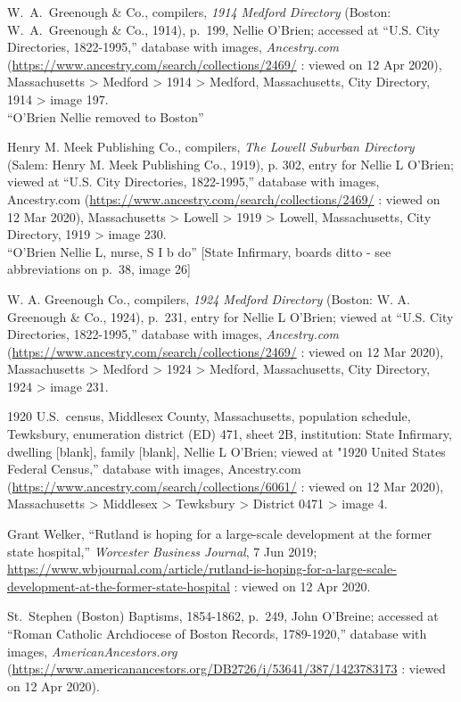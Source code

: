 \begin{thebibliography}{999}
	W.\ A.\ Greenough \& Co., compilers, \textit{1914 Medford Directory} (Boston: W.\ A.\ Greenough \& Co., 1914), p.\ 199, Nellie O'Brien; accessed at ``U.S. City Directories, 1822-1995,'' database with images, \textit{Ancestry.com} (\url{https://www.ancestry.com/search/collections/2469/} : viewed on 12 Apr 2020), Massachusetts > Medford > 1914 > Medford, Massachusetts, City Directory, 1914 > image 197.\\
	``O'Brien Nellie removed to Boston''
	
	Henry M. Meek Publishing Co., compilers, \textit{The Lowell Suburban Directory} (Salem: Henry M. Meek Publishing Co., 1919), p. 302, entry for Nellie L O'Brien; viewed at ``U.S. City Directories, 1822-1995,'' database with images, Ancestry.com (\url{https://www.ancestry.com/search/collections/2469/} : viewed on 12 Mar 2020), Massachusetts > Lowell > 1919 > Lowell, Massachusetts, City Directory, 1919 > image 230.\\
	``O'Brien Nellie L, nurse, S I b do'' [State Infirmary, boards ditto - see abbreviations on p.\ 38, image 26]
	
	W. A. Greenough Co., compilers, \textit{1924 Medford Directory} (Boston: W. A. Greenough \& Co., 1924), p.\ 231, entry for Nellie L O'Brien; viewed at ``U.S. City Directories, 1822-1995,'' database with images, \textit{Ancestry.com} (\url{https://www.ancestry.com/search/collections/2469/} : viewed on 12 Mar 2020), Massachusetts > Medford > 1924 > Medford, Massachusetts, City Directory, 1924 > image 231.
	
	1920 U.S.\ census, Middlesex County, Massachusetts, population schedule, Tewksbury, enumeration district (ED) 471, sheet 2B, institution: State Infirmary, dwelling [blank], family [blank], Nellie L O'Brien; viewed at "1920 United States Federal Census,” database with images, Ancestry.com (\url{https://www.ancestry.com/search/collections/6061/} : viewed on 12 Mar 2020), Massachusetts > Middlesex > Tewksbury > District 0471 > image 4.
	
	Grant Welker, ``Rutland is hoping for a large-scale development at the former state hospital,'' \textit{Worcester Business Journal}, 7 Jun 2019;  \url{https://www.wbjournal.com/article/rutland-is-hoping-for-a-large-scale-development-at-the-former-state-hospital} : viewed on 12 Apr 2020.
	
	St.\ Stephen (Boston) Baptisms, 1854-1862, p.\ 249, John O'Breine; accessed at ``Roman Catholic Archdiocese of Boston Records, 1789-1920,'' database with images, \textit{AmericanAncestors.org} (\url{https://www.americanancestors.org/DB2726/i/53641/387/1423783173} : viewed on 12 Apr 2020).
	

\end{thebibliography}

